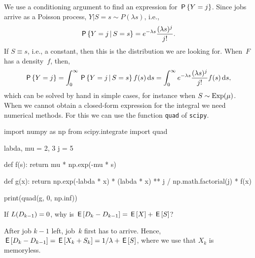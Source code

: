 \documentclass[stochastic-or.tex]{subfiles}
\begin{document}
We use a conditioning argument to find an expression for $\P{Y=j}$.
Since jobs arrive as a Poisson process, $Y|S=s \sim P(\lambda s)$, i.e.,
 \begin{equation*}
 \P{Y =j\given S=s} = e^{-\lambda s}\frac{(\lambda s)^j}{j!}.
 \end{equation*}
If $S\equiv s$, i.e., a constant, then this is the distribution we are looking for.   When~$F$ has a density~$f$, then,
 \begin{equation*}
 \P{Y=j} = \int_0^\infty \P{Y =j\given S=s} f(s) \d s = \int_{0}^{\infty} e^{-\lambda s}\frac{(\lambda s)^j}{j!} f(s) \d s,
\end{equation*}
which can be solved  by hand in simple cases, for instance  when $S\sim \Exp{\mu}$.
When we cannot obtain a closed-form expression for the integral we need numerical methods.
For this we can use the function \texttt{quad} of \texttt{scipy}.
\begin{python}
import numpy as np
from scipy.integrate import quad

labda, mu = 2, 3
j = 5


def f(s):
    return mu * np.exp(-mu * s)


def g(x):
    return np.exp(-labda * x) * (labda * x) ** j / np.math.factorial(j) * f(x)


print(quad(g, 0, np.inf))
\end{python}


\begin{exercise}\label{ex:17}
 If  $\L(D_{k-1}) = 0$, why is $\E{D_{k}-D_{k-1}} = \E{X} + \E{S}$?
\begin{solution}
  After job $k-1$ left, job~$k$ first has to arrive.
  Hence, $\E{D_k - D_{k-1}} = \E{X_k + S_k} = 1/\lambda + \E S$, where we use that $X_k$ is memoryless.
\end{solution}
\end{exercise}
\end{document}
